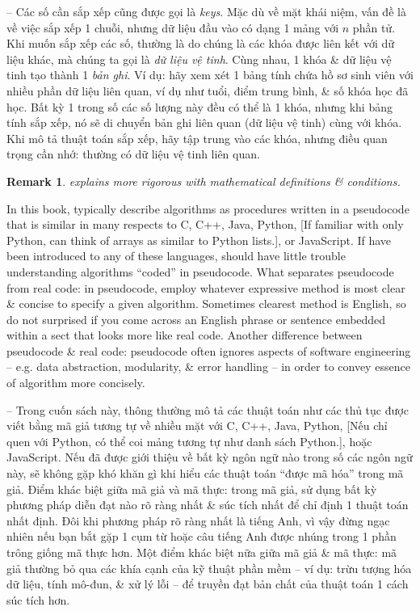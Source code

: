 \documentclass{article}
\newtheorem{remark}{Remark}
\begin{document}
\begin{itemize}
\begin{itemize}
\begin{itemize}
            -- Các số cần sắp xếp cũng được gọi là {\it keys}. Mặc dù về mặt khái niệm, vấn đề là về việc sắp xếp 1 chuỗi, nhưng dữ liệu đầu vào có dạng 1 mảng với $n$ phần tử. Khi muốn sắp xếp các số, thường là do chúng là các khóa được liên kết với dữ liệu khác, mà chúng ta gọi là {\it dữ liệu vệ tinh}. Cùng nhau, 1 khóa \& dữ liệu vệ tinh tạo thành 1 {\it bản ghi}. Ví dụ: hãy xem xét 1 bảng tính chứa hồ sơ sinh viên với nhiều phần dữ liệu liên quan, ví dụ như tuổi, điểm trung bình, \& số khóa học đã học. Bất kỳ 1 trong số các số lượng này đều có thể là 1 khóa, nhưng khi bảng tính sắp xếp, nó sẽ di chuyển bản ghi liên quan (dữ liệu vệ tinh) cùng với khóa. Khi mô tả thuật toán sắp xếp, hãy tập trung vào các khóa, nhưng điều quan trọng cần nhớ: thường có dữ liệu vệ tinh liên quan.
            
            \begin{remark}
                \cite{Knuth1998} explains more rigorous with mathematical definitions \& conditions.
            \end{remark}
            In this book, typically describe algorithms as procedures written in a pseudocode that is similar in many respects to C, C++, Java, Python, [If familiar with only Python, can think of arrays as similar to Python lists.], or JavaScript. If have been introduced to any of these languages, should have little trouble understanding algorithms ``coded'' in pseudocode. What separates pseudocode from real code: in pseudocode, employ whatever expressive method is most clear \& concise to specify a given algorithm. Sometimes clearest method is English, so do not surprised if you come across an English phrase or sentence embedded within a sect that looks more like real code. Another difference between pseudocode \& real code: pseudocode often ignores aspects of software engineering -- e.g. data abstraction, modularity, \& error handling -- in order to convey essence of algorithm more concisely.
            
            -- Trong cuốn sách này, thông thường mô tả các thuật toán như các thủ tục được viết bằng mã giả tương tự về nhiều mặt với C, C++, Java, Python, [Nếu chỉ quen với Python, có thể coi mảng tương tự như danh sách Python.], hoặc JavaScript. Nếu đã được giới thiệu về bất kỳ ngôn ngữ nào trong số các ngôn ngữ này, sẽ không gặp khó khăn gì khi hiểu các thuật toán ``được mã hóa'' trong mã giả. Điểm khác biệt giữa mã giả và mã thực: trong mã giả, sử dụng bất kỳ phương pháp diễn đạt nào rõ ràng nhất \& súc tích nhất để chỉ định 1 thuật toán nhất định. Đôi khi phương pháp rõ ràng nhất là tiếng Anh, vì vậy đừng ngạc nhiên nếu bạn bắt gặp 1 cụm từ hoặc câu tiếng Anh được nhúng trong 1 phần trông giống mã thực hơn. Một điểm khác biệt nữa giữa mã giả \& mã thực: mã giả thường bỏ qua các khía cạnh của kỹ thuật phần mềm -- ví dụ: trừu tượng hóa dữ liệu, tính mô-đun, \& xử lý lỗi -- để truyền đạt bản chất của thuật toán 1 cách súc tích hơn.
            

\end{itemize}
\end{itemize}
\end{itemize}
\end{document}
